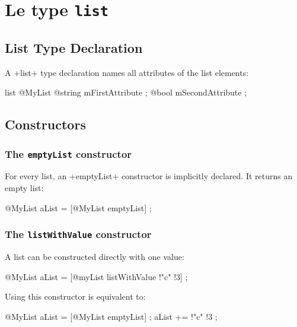 
\chapter{Le type \texttt{list}}

\section{List Type Declaration}

A \ggs+list+ type declaration names all attributes of the list elements:

\begin{galgas}
list @MyList {
  @string mFirstAttribute ;
  @bool mSecondAttribute ;
}
\end{galgas}

\section{Constructors}

\subsection{The \texttt{emptyList} constructor}

For every list, an \ggs+emptyList+ constructor is implicitly declared. It returns an empty list:

\begin{galgas}
@MyList aList = [@MyList emptyList] ;
\end{galgas}


\subsection{The \texttt{listWithValue} constructor}

A list can be constructed directly with one value:

\begin{galgas}
@MyList aList = [@myList listWithValue !"c" !3] ;
\end{galgas}


Using this constructor is equivalent to:

\begin{galgas}
@MyList aList = [@MyList emptyList] ;
aList += !"c" !3 ;
\end{galgas}

